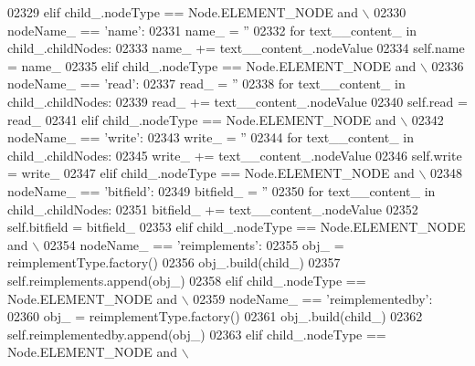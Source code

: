 \begin{DoxyCode}
{{{{{{{{{{{{{{{{{{{{{{{{{{{{{{{{{{{{{{{{{{{{{{{{{{{{{{{{{{{{{{{{{{{{{{{{{{{{{{{{{{{{{{{{{{{{{{{{{{{{{{{{{{{{{{{{{{{{{{{{{{{{{{{{{{{{{{{{{{{{{{{{{{{{{{{{{{{{{{{{{{{{{{{{{{02329         \textcolor{keywordflow}{elif} child\_.nodeType == Node.ELEMENT\_NODE \textcolor{keywordflow}{and} \(\backslash\)
02330             nodeName\_ == \textcolor{stringliteral}{'name'}:
02331             name\_ = \textcolor{stringliteral}{''}
02332             \textcolor{keywordflow}{for} text\_\_content\_ \textcolor{keywordflow}{in} child\_.childNodes:
02333                 name\_ += text\_\_content\_.nodeValue
02334             self.name = name\_
02335         \textcolor{keywordflow}{elif} child\_.nodeType == Node.ELEMENT\_NODE \textcolor{keywordflow}{and} \(\backslash\)
02336             nodeName\_ == \textcolor{stringliteral}{'read'}:
02337             read\_ = \textcolor{stringliteral}{''}
02338             \textcolor{keywordflow}{for} text\_\_content\_ \textcolor{keywordflow}{in} child\_.childNodes:
02339                 read\_ += text\_\_content\_.nodeValue
02340             self.read = read\_
02341         \textcolor{keywordflow}{elif} child\_.nodeType == Node.ELEMENT\_NODE \textcolor{keywordflow}{and} \(\backslash\)
02342             nodeName\_ == \textcolor{stringliteral}{'write'}:
02343             write\_ = \textcolor{stringliteral}{''}
02344             \textcolor{keywordflow}{for} text\_\_content\_ \textcolor{keywordflow}{in} child\_.childNodes:
02345                 write\_ += text\_\_content\_.nodeValue
02346             self.write = write\_
02347         \textcolor{keywordflow}{elif} child\_.nodeType == Node.ELEMENT\_NODE \textcolor{keywordflow}{and} \(\backslash\)
02348             nodeName\_ == \textcolor{stringliteral}{'bitfield'}:
02349             bitfield\_ = \textcolor{stringliteral}{''}
02350             \textcolor{keywordflow}{for} text\_\_content\_ \textcolor{keywordflow}{in} child\_.childNodes:
02351                 bitfield\_ += text\_\_content\_.nodeValue
02352             self.bitfield = bitfield\_
02353         \textcolor{keywordflow}{elif} child\_.nodeType == Node.ELEMENT\_NODE \textcolor{keywordflow}{and} \(\backslash\)
02354             nodeName\_ == \textcolor{stringliteral}{'reimplements'}:
02355             obj\_ = reimplementType.factory()
02356             obj\_.build(child\_)
02357             self.reimplements.append(obj\_)
02358         \textcolor{keywordflow}{elif} child\_.nodeType == Node.ELEMENT\_NODE \textcolor{keywordflow}{and} \(\backslash\)
02359             nodeName\_ == \textcolor{stringliteral}{'reimplementedby'}:
02360             obj\_ = reimplementType.factory()
02361             obj\_.build(child\_)
02362             self.reimplementedby.append(obj\_)
02363         \textcolor{keywordflow}{elif} child\_.nodeType == Node.ELEMENT\_NODE \textcolor{keywordflow}{and} \(\backslash\)
}}}}}}}}}}}}}}}}}}}}}}}}}}}}}}}}}}}}}}}}}}}}}}}}}}}}}}}}}}}}}}}}}}}}}}}}}}}}}}}}}}}}}}}}}}}}}}}}}}}}}}}}}}}}}}}}}}}}}}}}}}}}}}}}}}}}}}}}}}}}}}}}}}}}}}}}}}}}}}}}}}}}}}}}}}
\end{DoxyCode}
